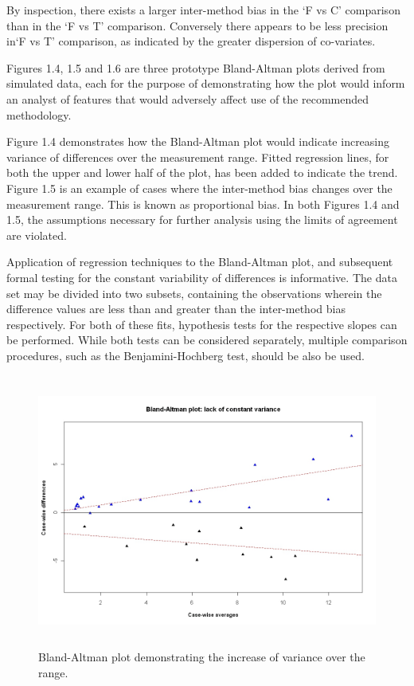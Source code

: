 \documentclass[12pt, a4paper]{report}
\begin{document}
	By inspection, there exists a larger inter-method bias in the `F
	vs C' comparison than in the `F vs T' comparison. Conversely there
	appears to be less precision in`F vs T' comparison, as indicated
	by the greater dispersion of co-variates.
	
	Figures 1.4, 1.5 and 1.6 are three prototype Bland-Altman plots
	derived from simulated data, each for the purpose of demonstrating
	how the plot would inform an analyst of features that would
	adversely affect use of the recommended methodology.
	
	Figure 1.4 demonstrates how the Bland-Altman plot would indicate
	increasing variance of differences over the measurement range.
	Fitted regression lines, for both the upper and lower half of the
	plot, has been added to indicate the trend. Figure 1.5 is an
	example of cases where the inter-method bias changes over the
	measurement range. This is known as proportional bias. In both
	Figures 1.4 and 1.5, the assumptions necessary for further
	analysis using the limits of agreement are violated.
	
	Application of regression techniques to the Bland-Altman plot, and
	subsequent formal testing for the constant variability of
	differences is informative. The data set may be divided into two
	subsets, containing the observations wherein the difference values
	are less than and greater than the inter-method bias respectively.
	For both of these fits, hypothesis tests for the respective slopes
	can be performed. While both tests can be considered separately,
	multiple comparison procedures, such as the Benjamini-Hochberg
	\citep{BH} test, should be also be used.
	
	\begin{figure}[h!]
		\begin{center}
			\includegraphics[height=90mm]{images/BAFanEffect.jpeg}
			\caption{Bland-Altman plot demonstrating the increase of variance over the range.}\label{BAFanEffect}
		\end{center}
	\end{figure}
	
\end{document}
